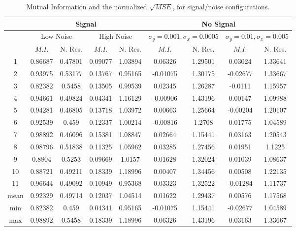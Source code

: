 \begin{table}[t]
\centering
\begin{tabular}{|c | c | c | c | c | c | c | c | c |}
\hline 
& \multicolumn{4}{|c|}{Signal} & \multicolumn{4}{|c|}{No Signal}\\
\hline
& \multicolumn{2}{|c|}{Low Noise} & \multicolumn{2}{|c|}{High Noise} 
& \multicolumn{2}{|c|}{$\sigma_y = 0.001, \sigma_x = 0.0005$} 
& \multicolumn{2}{|c|}{$\sigma_y = 0.01, \sigma_x = 0.005$}\\
\hline 
& $M.I.$ & N. Res. &
  $M.I.$ & N. Res. &
  $M.I.$ & N. Res. &
  $M.I.$ & N. Res. \\
\hline       
\hline       
1 &   0.86687  &0.47801 &  0.09077  &1.03894 &  0.06326  &  1.29501 & 0.03024  &1.33641 \\
2 &   0.93975  &0.53177 &  0.13767  &0.95165 &  -0.01075  & 1.30175 & -0.02677 &1.33667 \\
3 &   0.82382  &0.5458  &  0.13505  &0.99539 &  0.02345  &  1.26287 & -0.0111  &1.15957 \\
4 &   0.94661  &0.49824 &  0.04341  &1.16129 &  -0.00906  & 1.43196 & 0.00147  &1.09988 \\
5 &   0.94281  &0.46805 &  0.13718  &1.03972 &  0.00663  &  1.25664 & -0.00204 &1.20107 \\
6 &   0.92539  &0.459   &  0.12337  &1.00214 &  -0.00816  & 1.2708 &  0.01775  &1.04589 \\
7 &   0.98892  &0.46096 &  0.15381  &1.08847 &  0.02664  &  1.15441 & 0.03163  &1.20543 \\
8 &   0.98796  &0.51838 &  0.11325  &1.05962 &  0.03285  &  1.27456 & 0.01951  &1.1225 \\
9 &   0.8804   &0.5253  &  0.09669  &1.0157  &  0.01628  &  1.32024 & 0.01039  &1.08637 \\
10 &  0.88721   &0.49211 & 0.18339  &1.18996 &  0.00407  &  1.34456 & 0.00508  &1.22135 \\
11 &  0.96644   &0.49092 & 0.10949  &0.95368 &  0.03323  &  1.32522 & -0.01284 &1.11737 \\
\hline                                                                         
mean &0.92329  &0.49714 & 0.12037   &1.04514 &  0.01622  &  1.29437 & 0.00576  &1.17568 \\
\hline                                                                           
min &  0.82382  &0.459   &  0.04341  &0.95165 & -0.01075  & 1.15441 & -0.02677 &1.04589 \\
\hline                                                                         
max &  0.98892  &0.5458  & 0.18339   &1.18996 & 0.06326  &  1.43196 & 0.03163  &1.33667 \\
\hline
\end{tabular}
\caption{Mutual Information and the normalized $\sqrt{MSE}$, 
    for signal/noise configurations.}
\label{tab:SingleVoxelActivationComparison} 
\end{table}


